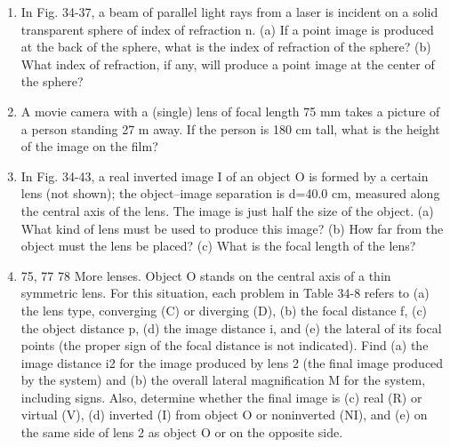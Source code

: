 \documentclass[fleqn]{article}
\begin{document}
\begin{enumerate}
    \item In Fig. 34-37, a beam of parallel light rays from a laser is incident on a solid transparent sphere of index of refraction n. (a) If a point image is produced at the back of the sphere, what is the index of refraction of the sphere? (b) What index of refraction, if any, will produce a point image at the center of the sphere?
    
    \item A movie camera with a (single) lens of focal length 75 mm takes a picture of a person standing 27 m away. If the person is 180 cm tall, what is the height of the image on the film?

    \item In Fig. 34-43, a real inverted image I of an object O is formed by a certain lens (not shown); the object–image separation is d=40.0 cm, measured along the central axis of the lens. The image is just half the size of the object. (a) What kind of lens must be used to produce this image? (b) How far from the object must the lens be placed? (c) What is the focal length of the lens?
    
    \item 75, 77 78 More lenses. Object O stands on the central axis of a thin symmetric lens. For this situation, each problem in Table 34-8 refers to (a) the lens type, converging (C) or diverging (D), (b) the focal distance f, (c) the object distance p, (d) the image distance i, and (e) the lateral of its focal points (the proper sign of the focal distance is not indicated). Find (a) the image distance i2 for the image produced by lens 2 (the final image produced by the system) and (b) the overall lateral magnification M for the system, including signs. Also, determine whether the final image is (c) real (R) or virtual (V), (d) inverted (I) from object O or noninverted (NI), and (e) on the same side of lens 2 as object O or on the opposite side.
    
  \end{enumerate}
\end{document}
